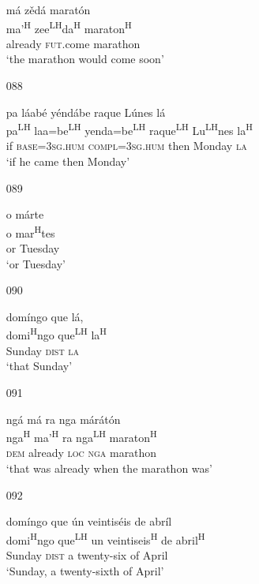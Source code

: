 \begin{itemize}
\glll   m\'{a} z\v{e}d\'{a} marat\'{o}n\\
ma'\textsuperscript{H} zee\textsuperscript{LH}da\textsuperscript{H} maraton\textsuperscript{H}\\
already \textsc{fut}.come marathon\\
\glt `the marathon would come soon'
 


\item[088]
 
\glll   pa l\'{a}ab\'{e} y\'{e}nd\'{a}be raque L\'{u}nes l\'{a}\\
pa\textsuperscript{LH} laa=be\textsuperscript{LH} yenda=be\textsuperscript{LH} raque\textsuperscript{LH} Lu\textsuperscript{LH}nes la\textsuperscript{H}\\
if \textsc{base}=\textsc{3sg.hum} \textsc{compl}=\textsc{3sg.hum} then Monday \textsc{la}\\
\glt `if he came then Monday'
 


\item[089]
 
\glll   o m\'{a}rte\\
o mar\textsuperscript{H}tes\\
or Tuesday\\
\glt `or Tuesday'
 


\item[090]
 
\glll   dom\'{i}ngo que l\'{a},\\
domi\textsuperscript{H}ngo que\textsuperscript{LH} la\textsuperscript{H}\\
Sunday \textsc{dist} \textsc{la}\\
\glt `that Sunday'
 

\item[091]
 
\glll   ng\'{a} m\'{a} ra nga m\'{a}r\'{a}t\'{o}n\\
 nga\textsuperscript{H} ma'\textsuperscript{H} ra nga\textsuperscript{LH} maraton\textsuperscript{H}\\
\textsc{dem} already \textsc{loc} \textsc{nga} marathon\\
\glt `that was already when the marathon was'
 


\item[092]
 
\glll   dom\'{i}ngo que \'{u}n veintis\'{e}is de abr\'{i}l\\
domi\textsuperscript{H}ngo que\textsuperscript{LH} un veintiseis\textsuperscript{H} de abril\textsuperscript{H}\\
Sunday \textsc{dist} a twenty-six of April\\
\glt `Sunday, a twenty-sixth of April'
 


\end{itemize}
